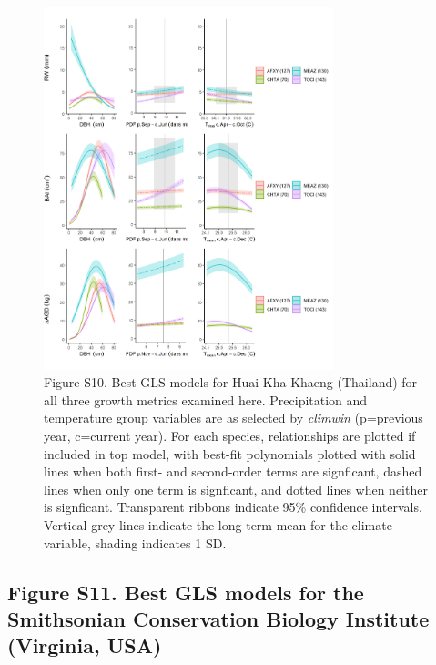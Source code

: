 \documentclass[
]{article}
\begin{document}
\begin{figure}
\centering
\includegraphics[width=0.75\textwidth,height=\textheight]{tables_figures/SI_figures/composite_plots/HKK.png}
\caption{Figure S10. Best GLS models for Huai Kha Khaeng (Thailand) for
all three growth metrics examined here. Precipitation and temperature
group variables are as selected by \emph{climwin} (p=previous year,
c=current year). For each species, relationships are plotted if included
in top model, with best-fit polynomials plotted with solid lines when
both first- and second-order terms are signficant, dashed lines when
only one term is signficant, and dotted lines when neither is
signficant. Transparent ribbons indicate 95\% confidence intervals.
Vertical grey lines indicate the long-term mean for the climate
variable, shading indicates 1 SD.}
\end{figure}

\newpage

\hypertarget{figure-s11.-best-gls-models-for-the-smithsonian-conservation-biology-institute-virginia-usa}{%
\subsection{Figure S11. Best GLS models for the Smithsonian Conservation
Biology Institute (Virginia,
USA)}\label{figure-s11.-best-gls-models-for-the-smithsonian-conservation-biology-institute-virginia-usa}}
\end{document}
